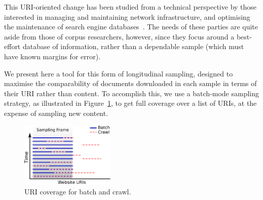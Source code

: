 \documentclass[11pt]{article}
\begin{document}
This URI-oriented change has been studied from a technical perspective by those interested in managing and maintaining network infrastructure, and optimising the maintenance of search engine databases~\cite{koehler2004longitudinal}.  The needs of these parties are quite aside from those of corpus researchers, however, since they focus around a best-effort database of information, rather than a dependable sample (which must have known margins for error).
% 
% 


We present here a tool for this form of longitudinal sampling, designed to maximise the comparability of documents downloaded in each sample in terms of their URI rather than content.  To accomplish this, we use a batch-mode sampling strategy, as illustrated in Figure~\ref{fig:sampling}, to get full coverage over a list of URIs, at the expense of sampling new content.

\begin{figure}[h]
\centering
\includegraphics[width=0.4\textwidth]{images/samples.eps}
\caption{URI coverage for batch and crawl.}
\label{fig:sampling}
\end{figure}
\end{document}
